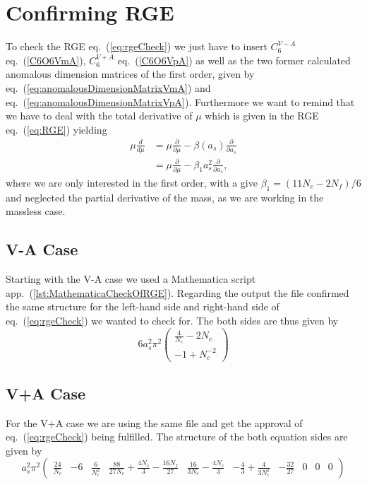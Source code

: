 \section{Confirming RGE}
To check the RGE eq.~(\ref{eq:rgeCheck}) we just have to insert $C^{V-A}_6$ eq.~(\ref{C6O6VmA}), $C^{V+A}_6$ eq.~(\ref{C6O6VpA}) as well as the two former calculated anomalous dimension matrices of the first order, given by eq.~(\ref{eq:anomalousDimensionMatrixVmA}) and eq.~(\ref{eq:anomalousDimensionMatrixVpA}). Furthermore we want to remind that we have to deal with the total derivative of $\mu$ which is given in the RGE eq.~(\ref{eq:RGE}) yielding
\begin{equation}
	\begin{split}
		\mu \frac{d}{d \mu} &= \mu \frac{\partial}{\partial \mu} - \beta(a_s)  \frac{\partial}{\partial a_s}  \\
		&=  \mu \frac{\partial}{\partial \mu} - \beta_1 a_s^2 \frac{\partial}{\partial a_s}, 
	\end{split}
\end{equation}
where we are only interested in the first order, with a give $\beta_1 = (11 N_c - 2N_f)/6$ and neglected the partial derivative of the mass, as we are working in the massless case.

\subsection*{V-A Case}
Starting with the V-A case we used a Mathematica script app.~(\ref{lst:MathematicaCheckOfRGE}). Regarding the output the file confirmed the same structure for the left-hand side and right-hand side of eq.~(\ref{eq:rgeCheck}) we wanted to check for. The both sides are thus given by
\begin{equation}
	6 a^2_s \pi^2 
	\begin{pmatrix}
		\frac{4}{N_c} - 2 N_c \\
		-1 + N_c^{-2}
	\end{pmatrix}
\end{equation}

\subsection*{V+A Case}
For the V+A case we are using the same file and get the approval of eq.~(\ref{eq:rgeCheck}) being fulfilled. The structure of the both equation sides are given by
\begin{equation}
	a^2_s \pi^2
	\begin{pmatrix}
		\frac{24}{N_c} & -6 & \frac{6}{N_c^2} & \frac{88}{27 N_c} + \frac{4 N_c}{3} - \frac{16 N_f}{27} & \frac{16}{3N_c} - \frac{4 N_c}{3} & - \frac{4}{3} + \frac{4}{3N_c^2} & - \frac{32}{27} & 0 & 0 & 0
	\end{pmatrix}
\end{equation} 
